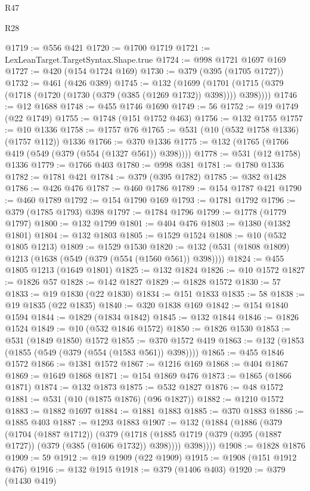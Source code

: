 \begin{lexlean}{R47}
\begin{lexlean}{R28}
\begin{coremodule}
{{{{{{{{{{{{{{{{{{{{{{{{{{{{{{{{{{{{{{{{{{{{{{{{{{{{{{{{{{{{{{{{{{{{{{{{{{{{{{{{{{{{{{{{{{{{{{{{{{{{{{{{{{{{{{{{{{{{{{{{{{{{{{{{{{{{{@1719 := @556 @421
@1720 := @1700 @1719
@1721 := LexLeanTarget.TargetSyntax.Shape.true
@1724 := @998 @1721 @1697 @169
@1727 := @420 (@154 @1724 @169)
@1730 := @379 (@395 (@1705 @1727))
@1732 := @461 (@426 @389)
@1745 := @132
    (@1699 (@1701 (@1715 (@379 (@1718 (@1720 (@1730 (@379 (@385 (@1269 @1732)) @398)))) @398))))
@1746 := @12 @1688
@1748 := @455 @1746 @1690
@1749 := 56
@1752 := @19 @1749 (@22 @1749)
@1755 := @1748 (@151 @1752 @463)
@1756 := @132 @1755
@1757 := @10 @1336
@1758 := @1757 @76
@1765 := @531 (@10 (@532 @1758 @1336) (@1757 @112)) @1336
@1766 := @370 @1336
@1775 := @132 (@1765 (@1766 @419 (@549 (@379 (@554 (@1327 @561)) @398))))
@1778 := @531 (@12 @1758) @1336
@1779 := @1766 @403
@1780 := @998 @381
@1781 := @1780 @1336
@1782 := @1781 @421
@1784 := @379 (@395 @1782)
@1785 := @382 @1428
@1786 := @426 @476
@1787 := @460 @1786
@1789 := @154 @1787 @421
@1790 := @460 @1789
@1792 := @154 @1790 @169
@1793 := @1781 @1792
@1796 := @379 (@1785 @1793) @398
@1797 := @1784 @1796
@1799 := @1778 (@1779 @1797)
@1800 := @132 @1799
@1801 := @404 @476
@1803 := @1380 (@1382 @1801)
@1804 := @132 @1803
@1805 := @1529 @1524
@1808 := @10 (@532 @1805 @1213)
@1809 := @1529 @1530
@1820 := @132 (@531 (@1808 @1809) @1213 (@1638 (@549 (@379 (@554 (@1560 @561)) @398))))
@1824 := @455 @1805 @1213 (@1649 @1801)
@1825 := @132 @1824
@1826 := @10 @1572
@1827 := @1826 @57
@1828 := @142 @1827
@1829 := @1828 @1572
@1830 := 57
@1833 := @19 @1830 (@22 @1830)
@1834 := @151 @1833
@1835 := 58
@1838 := @19 @1835 (@22 @1835)
@1840 := @320 @1838 @169
@1842 := @154 @1840 @1594
@1844 := @1829 (@1834 @1842)
@1845 := @132 @1844
@1846 := @1826 @1524
@1849 := @10 (@532 @1846 @1572)
@1850 := @1826 @1530
@1853 := @531 (@1849 @1850) @1572
@1855 := @370 @1572 @419
@1863 := @132 (@1853 (@1855 (@549 (@379 (@554 (@1583 @561)) @398))))
@1865 := @455 @1846 @1572
@1866 := @1381 @1572
@1867 := @1216 @169
@1868 := @404 @1867
@1869 := @1649 @1868
@1871 := @154 @1869 @476
@1873 := @1865 (@1866 @1871)
@1874 := @132 @1873
@1875 := @532 @1827
@1876 := @48 @1572
@1881 := @531 (@10 (@1875 @1876) (@96 @1827))
@1882 := @1210 @1572
@1883 := @1882 @1697
@1884 := @1881 @1883
@1885 := @370 @1883
@1886 := @1885 @403
@1887 := @1293 @1883
@1907 := @132
    (@1884
      (@1886
        (@379
          (@1704 (@1887 @1712))
          (@379
            (@1718 (@1885 @1719 (@379 (@395 (@1887 @1727)) (@379 (@385 (@1606 @1732)) @398))))
            @398))))
@1908 := @1828 @1876
@1909 := 59
@1912 := @19 @1909 (@22 @1909)
@1915 := @1908 (@151 @1912 @476)
@1916 := @132 @1915
@1918 := @379 (@1406 @403)
@1920 := @379 (@1430 @419)
}}}}}}}}}}}}}}}}}}}}}}}}}}}}}}}}}}}}}}}}}}}}}}}}}}}}}}}}}}}}}}}}}}}}}}}}}}}}}}}}}}}}}}}}}}}}}}}}}}}}}}}}}}}}}}}}}}}}}}}}}}}}}}}}}}}}}
\end{coremodule}
\end{lexlean}
\end{lexlean}
